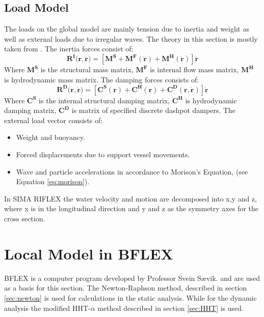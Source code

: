 \subsection{Load Model}
The loads on the global model are mainly tension due to inertia and weight as well as external loads due to irregular waves. The theory in this section is mostly taken from \cite{sintef2017}.\newline
\newline
\noindent The inertia forces consist of:
\begin{equation}
    \boldsymbol{R^I(r,\dot{r}})= [\boldsymbol{M^S} + \boldsymbol{M^F(\dot{r})} + \boldsymbol{M^H (\dot{r})} ]\boldsymbol{\ddot{r}}
\end{equation}
Where $\boldsymbol{M^S}$ is the structural mass matrix, $\boldsymbol{M^F}$ is internal flow mass matrix, $\boldsymbol{M^H}$ is hydrodynamic mass matrix. 
\newline
\newline
\noindent The damping forces consists of:
\begin{equation}
    \boldsymbol{R^D(r,\dot{r}})= [\boldsymbol{C^S(r)} + \boldsymbol{C^H(r)} + \boldsymbol{C^D (r,\dot{r})} ]\boldsymbol{\dot{r}}
\end{equation}
Where $\boldsymbol{C^S}$ is the  internal structural damping matrix, $\boldsymbol{C^H}$ is hydrodynamic damping matrix, $\boldsymbol{C^D}$ is matrix of specified discrete dashpot dampers. \newline
\newline
\noindent The external load vector consists of:
\begin{itemize}
\item Weight and buoyancy.
\item Forced displacements due to support vessel movements.
\item Wave and particle accelerations in accordance to Morison's Equation, (see Equation \ref{eq:morison}).
\end{itemize}
In SIMA RIFLEX the water velocity and motion are decomposed into x,y and z, where x is in the longitudinal direction and y and z as the symmetry axes for the cross section.

\section{Local Model in BFLEX }
BFLEX is a computer program developed by Professor Svein Sævik. \cite{Bflextheory2013}  and \cite{Bflextheory2017} are used as a basis for this section.  The Newton-Raphson method, described in section \ref{sec:newton} is used for calculations in the static analysis. While for the dynamic analysis the modified HHT-$\alpha$ method described in section \ref{sec:HHT} is used.

